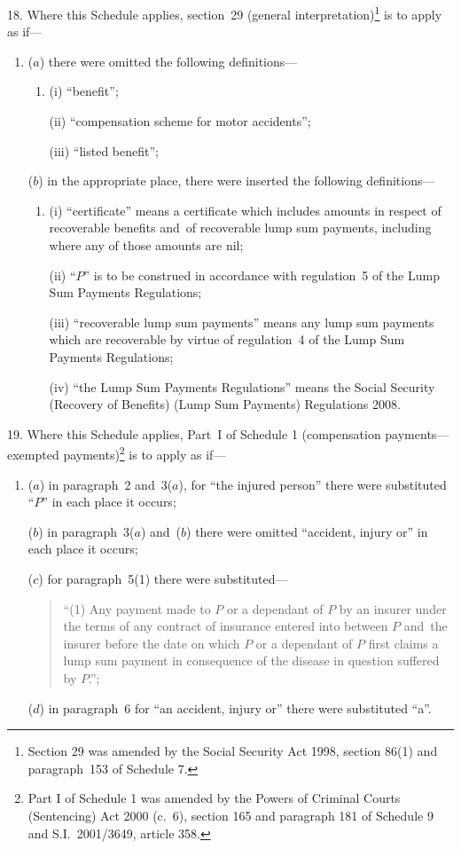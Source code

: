 \documentclass[12pt,a4paper]{article}
\begin{document}
18.  Where this Schedule applies, section~29 (general interpretation)\footnote{Section 29 was amended by the Social Security Act 1998, section 86(1) and paragraph~153 of Schedule 7.} is to apply as if—
\begin{enumerate}\item[]
($a$) there were omitted the following definitions—
\begin{enumerate}\item[]
(i) “benefit”;

(ii) “compensation scheme for motor accidents”;

(iii) “listed benefit”;
\end{enumerate}

($b$) in the appropriate place, there were inserted the following definitions—
\begin{enumerate}\item[]
(i) “certificate” means a certificate which includes amounts in respect of recoverable benefits and~of recoverable lump sum payments, including where any of those amounts are nil;

(ii) “$P$” is to be construed in accordance with regulation~5 of the Lump Sum Payments Regulations;

(iii) “recoverable lump sum payments” means any lump sum payments which are recoverable by virtue of regulation~4 of the Lump Sum Payments Regulations;

(iv) “the Lump Sum Payments Regulations” means the Social Security (Recovery of Benefits) (Lump Sum Payments) Regulations 2008.
\end{enumerate}
\end{enumerate}

\medskip

19.  Where this Schedule applies, Part~I of Schedule 1 (compensation payments---exempted payments)\footnote{Part I of Schedule 1 was amended by the Powers of Criminal Courts (Sentencing) Act 2000 (c.~6), section 165 and paragraph 181 of Schedule 9 and S.I.~2001/3649, article 358.} is to apply as if—
\begin{enumerate}\item[]
($a$) in paragraph~2 and~3($a$), for “the injured person” there were substituted “$P$” in each place it occurs;

($b$) in paragraph~3($a$)  and~($b$)  there were omitted “accident, injury or” in each place it occurs;

($c$) for paragraph~5(1) there were substituted—
\begin{quotation}
“(1) Any payment made to $P$ or a dependant of $P$ by an insurer under the terms of any contract of insurance entered into between $P$ and~the insurer before the date on which $P$ or a dependant of $P$ first claims a lump sum payment in consequence of the disease in question suffered by $P$.”;
\end{quotation}

($d$) in paragraph~6 for “an accident, injury or” there were substituted “a”.
\end{enumerate}
\end{document}
